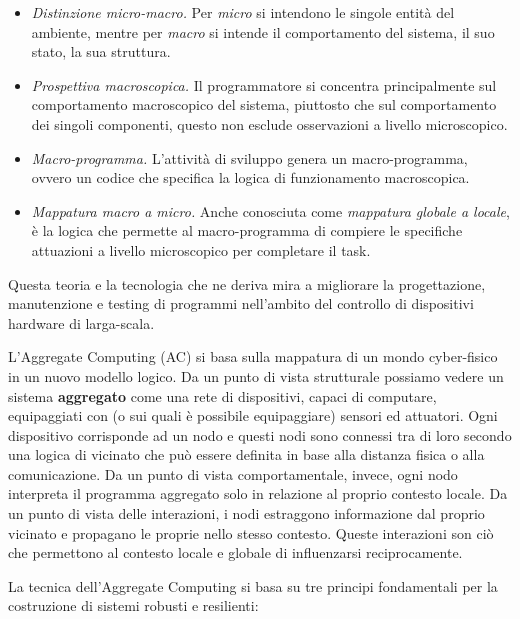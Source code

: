 \documentclass[12pt,a4paper,openright,twoside]{book}
\begin{document}
\begin{itemize}
    \item \textit{Distinzione micro-macro.} Per \textit{micro} si intendono le singole entità del ambiente, mentre per \textit{macro} si intende il comportamento del sistema, il suo stato, la sua struttura.
    \item \textit{Prospettiva macroscopica.} Il programmatore si concentra principalmente sul comportamento macroscopico del sistema, piuttosto che sul comportamento dei singoli componenti, questo non esclude osservazioni a livello microscopico.
    \item \textit{Macro-programma.} L'attività di sviluppo genera un macro-programma, ovvero un codice che specifica la logica di funzionamento macroscopica.
    \item \textit{Mappatura macro a micro.} Anche conosciuta come \textit{mappatura globale a locale}, è la logica che permette al macro-programma di compiere le specifiche attuazioni a livello microscopico per completare il task.
\end{itemize}

Questa teoria e la tecnologia che ne deriva mira a migliorare la progettazione, manutenzione e testing di programmi nell'ambito del controllo di dispositivi hardware di larga-scala. 

L'Aggregate Computing (AC) si basa sulla mappatura di un mondo cyber-fisico in un nuovo modello logico. Da un punto di vista strutturale possiamo vedere un sistema \textbf{aggregato} come una rete di dispositivi, capaci di computare, equipaggiati con (o sui quali è possibile equipaggiare) sensori ed attuatori. Ogni dispositivo corrisponde ad un nodo e questi nodi sono connessi tra di loro secondo una logica di vicinato che può essere definita in base alla distanza fisica o alla comunicazione. Da un punto di vista comportamentale, invece, ogni nodo interpreta il programma aggregato solo in relazione al proprio contesto locale. Da un punto di vista delle interazioni, i nodi estraggono informazione dal proprio vicinato e propagano le proprie nello stesso contesto. Queste interazioni son ciò che permettono al contesto locale e globale di influenzarsi reciprocamente.

La tecnica dell'Aggregate Computing si basa su tre principi fondamentali per la costruzione di sistemi robusti e resilienti:
\end{document}
